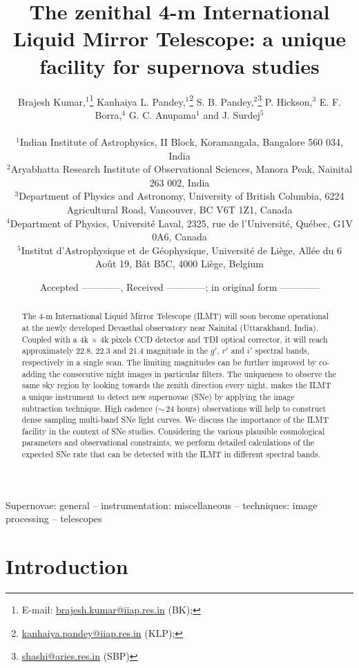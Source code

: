 \documentclass[useAMS,usenatbib]{mnras}
\title[Supernova studies with the ILMT]{The zenithal 4-m International Liquid Mirror Telescope: a unique facility for supernova studies}
\author[B. Kumar et al.]
{Brajesh Kumar,$^{1}$\thanks{E-mail: 
\href{mailto:brajesh.kumar@iiap.res.in}{brajesh.kumar@iiap.res.in} (BK);} 
Kanhaiya L. Pandey,$^{1}$\thanks{
\href{mailto:kanhaiya.pandey@iiap.res.in}{kanhaiya.pandey@iiap.res.in} (KLP);} 
S. B. Pandey,$^{2}$\thanks{
\href{mailto:shashi@aries.res.in}{shashi@aries.res.in} (SBP)}
P. Hickson,$^{3}$
E. F. Borra,$^{4}$
\newauthor G. C. Anupama$^{1}$ 
and J. Surdej$^{5}$
\\\\
$^{1}$Indian Institute of Astrophysics, II Block, Koramangala, Bangalore 560 034, India\\
$^{2}$Aryabhatta Research Institute of Observational Sciences, Manora Peak, Nainital 263 002, India\\
$^{3}$Department of Physics and Astronomy, University of British Columbia, 6224 Agricultural Road, 
      Vancouver, BC V6T 1Z1, Canada\\
$^{4}$Department of Physics, Universit\'{e} Laval, 2325, rue de l'Universit\'{e}, Qu\'{e}bec, G1V 0A6, Canada\\
$^{5}$Institut d'Astrophysique et de G\'{e}ophysique, Universit\'{e} de Li\`{e}ge, All\'{e}e du 6 Ao\^{u}t 19, 
      B\^{a}t B5C, 4000 Li\`{e}ge, Belgium
}
\date{Accepted ------------, Received ------------; in original form ------------}
\begin{document}
\label{firstpage}
\pagerange{\pageref{firstpage}--\pageref{lastpage}}
\maketitle

\begin{abstract}

The 4-m International Liquid Mirror Telescope (ILMT) will soon become operational at the newly 
developed Devasthal observatory near Nainital (Uttarakhand, India). Coupled with a 4k $\times$ 4k 
pixels CCD detector and TDI optical corrector, it will reach approximately 22.8, 22.3 and 21.4 
magnitude in the $g'$, $r'$ and $i'$ spectral bands, respectively in a single scan. The limiting 
magnitudes can be further improved by co-adding the consecutive night images in particular filters. 
The uniqueness to observe the same sky region by looking towards the zenith direction every night, 
makes the ILMT a unique instrument to detect new supernovae (SNe) by applying the image subtraction 
technique. High cadence ($\sim$\,24 hours) observations will help to construct dense sampling 
multi-band SNe light curves. We discuss the importance of the ILMT facility in the context of SNe 
studies. Considering the various plausible cosmological parameters and observational constraints, 
we perform detailed calculations of the expected SNe rate that can be detected with the ILMT 
in different spectral bands. 

\end{abstract}

\begin{keywords}
Supernovae: general -- instrumentation: miscellaneous -- techniques: image processing -- telescopes
\end{keywords} 

\section{Introduction}
\end{document}
